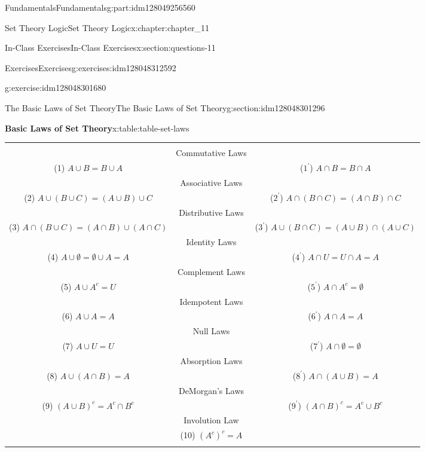 \documentclass[oneside,10pt,]{book}
\newcommand{\tabularfont}{\relax}
\numberwithin{equation}{section}
\newcommand{\hrulethin}  {\noalign{\hrule height 0.04em}}
\begin{document}
\begin{partptx}{Fundamentals}{}{Fundamentals}{}{}{g:part:idm128049256560}
\begin{chapterptx}{Set Theory Logic}{}{Set Theory Logic}{}{}{x:chapter:chapter_11}
\begin{sectionptx}{In-Class Exercises}{}{In-Class Exercises}{}{}{x:section:questions-11}
\begin{exercises-subsection}{Exercises}{}{Exercises}{}{}{g:exercises:idm128048312592}
\begin{exercisegroup}
\begin{divisionexerciseeg}{3}{}{}{g:exercise:idm128048301680}
\end{divisionexerciseeg}%
\end{exercisegroup}
\par\medskip\noindent
\end{exercises-subsection}
\end{sectionptx}
%
%
\typeout{************************************************}
\typeout{************************************************}
%
\begin{sectionptx}{The Basic Laws of Set Theory}{}{The Basic Laws of Set Theory}{}{}{g:section:idm128048301296}
\begin{tableptx}{\textbf{Basic Laws of Set Theory}}{x:table:table-set-laws}{}%
\centering
{\tabularfont%
\begin{tabular}{ccc}
&&\tabularnewline[0pt]
&Commutative Laws&\tabularnewline[0pt]
(1) \(A \cup B = B \cup  A\)&&(\(1^{\prime}\)) \(A \cap B = B\cap A\)\tabularnewline\hrulethin
&Associative Laws&\tabularnewline[0pt]
(2) \(A \cup  (B \cup  C)= (A\cup B)\cup C\)&&(\(2^{\prime}\)) \(A \cap  (B \cap  C) = (A \cap  B) \cap  C \)\tabularnewline\hrulethin
&Distributive Laws&\tabularnewline[0pt]
(3) \(A\cap (B \cup  C)=(A\cap B )\cup (A\cap  C)\)&&(\(3^{\prime}\)) \(A \cup (B \cap C) = (A \cup B ) \cap (A\cup C)\)\tabularnewline\hrulethin
&Identity Laws&\tabularnewline[0pt]
(4) \(A \cup  \emptyset  = \emptyset  \cup  A = A\)&&(\(4^{\prime}\)) \(A \cap  U = U \cap  A = A\)\tabularnewline\hrulethin
&Complement Laws&\tabularnewline[0pt]
(5) \(A\cup A^c= U\)&&(\(5^{\prime}\)) \(A\cap A^c= \emptyset\)\tabularnewline\hrulethin
&Idempotent Laws&\tabularnewline[0pt]
(6) \(A \cup  A = A\)&&(\(6^{\prime}\)) \(A\cap  A = A\)\tabularnewline\hrulethin
&Null Laws&\tabularnewline[0pt]
(7) \(A \cup  U = U\)&&(\(7^{\prime}\)) \(A \cap  \emptyset  =\emptyset\)\tabularnewline\hrulethin
&Absorption Laws&\tabularnewline[0pt]
(8) \(A \cup  (A\cap  B) = A\)&&(\(8^{\prime}\)) \(A\cap (A \cup  B) = A\)\tabularnewline\hrulethin
&DeMorgan's Laws&\tabularnewline[0pt]
(9) \((A \cup  B)^c= A^c\cap  B^c\)&&(\(9^{\prime}\)) \((A\cap  B)^c = A^c \cup  B^c\)\tabularnewline\hrulethin
&Involution Law&\tabularnewline[0pt]
&(10) \((A^c)^c= A\)&\tabularnewline\hrulethin
\end{tabular}
}%
\end{tableptx}%
\end{sectionptx}
\end{chapterptx}
%
\typeout{************************************************}

\end{partptx}
\end{document}
